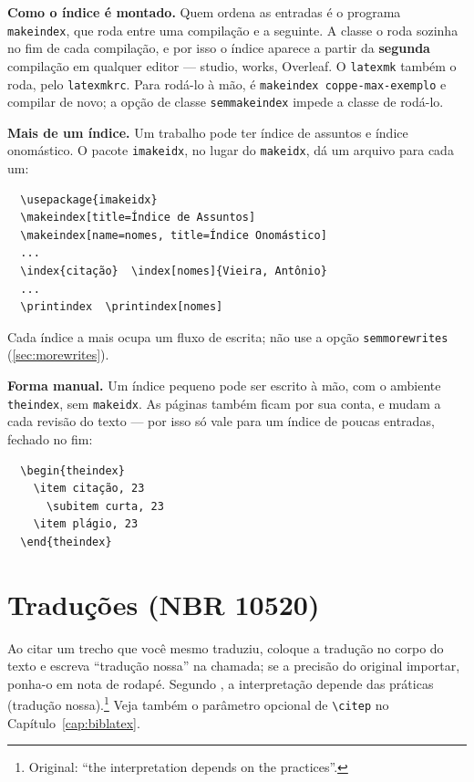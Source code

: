 \documentclass[dsc,setavermelha,numeracaoporcapitulo,linhanafolhaderosto]{ufrj}
\theoremstyle{plain}
\theoremstyle{definition}
\theoremstyle{remark}
\begin{document}
  \textbf{Como o índice é montado.} Quem ordena as entradas é o programa \verb|makeindex|, que roda entre uma compilação e a seguinte. A classe o roda sozinha no fim de cada compilação, e por isso o índice aparece a partir da \textbf{segunda} compilação em qualquer editor --- studio, works, Overleaf. O \verb|latexmk| também o roda, pelo \texttt{latexmkrc}. Para rodá-lo à mão, é \verb|makeindex coppe-max-exemplo| e compilar de novo; a opção de classe \verb|semmakeindex| impede a classe de rodá-lo.

  \textbf{Mais de um índice.} Um trabalho pode ter índice de assuntos e índice onomástico. O pacote \verb|imakeidx|, no lugar do \verb|makeidx|, dá um arquivo para cada um:
  \begin{verbatim}
  \usepackage{imakeidx}
  \makeindex[title=Índice de Assuntos]
  \makeindex[name=nomes, title=Índice Onomástico]
  ...
  \index{citação}  \index[nomes]{Vieira, Antônio}
  ...
  \printindex  \printindex[nomes]
  \end{verbatim}
  Cada índice a mais ocupa um fluxo de escrita; não use a opção \verb|semmorewrites| (\autoref{sec:morewrites}).

  \textbf{Forma manual.} Um índice pequeno pode ser escrito à mão, com o ambiente \verb|theindex|, sem \verb|makeidx|. As páginas também ficam por sua conta, e mudam a cada revisão do texto --- por isso só vale para um índice de poucas entradas, fechado no fim:
  \begin{verbatim}
  \begin{theindex}
    \item citação, 23
      \subitem curta, 23
    \item plágio, 23
  \end{theindex}
  \end{verbatim}

  \section{Traduções (NBR 10520)}

  Ao citar um trecho que você mesmo traduziu, coloque a tradução no corpo do texto e escreva ``tradução nossa'' na chamada; se a precisão do original importar, ponha-o em nota de rodapé. Segundo \citet[p.~45]{article-example}, a interpretação depende das práticas (tradução nossa).\footnote{Original: ``the interpretation depends on the practices''.} Veja também o parâmetro opcional de \verb|\citep| no Capítulo~\ref{cap:biblatex}.
\end{document}
